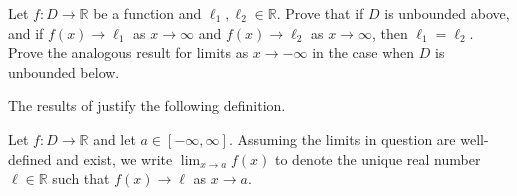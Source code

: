 \begin{exercise}
\label{exInfiniteLimitsOfFunctionsAreUnique}
Let $f : D \to \mathbb{R}$ be a function and $\ell_1, \ell_2 \in \mathbb{R}$. Prove that if $D$ is unbounded above, and if $f(x) \to \ell_1$ as $x \to \infty$ and $f(x) \to \ell_2$ as $x \to \infty$, then $\ell_1=\ell_2$. Prove the analogous result for limits as $x \to -\infty$ in the case when $D$ is unbounded below.
\end{exercise}

The results of  justify the following definition.

\begin{definition}
\label{defLimitOfFunctionNotation}
Let $f : D \to \mathbb{R}$ and let $a \in [-\infty, \infty]$. Assuming the limits in question are well-defined and exist, we write $\displaystyle \lim_{x \to a} f(x)$ to denote the unique real number $\ell \in \mathbb{R}$ such that $f(x) \to \ell$ as $x \to a$.
\end{definition}




